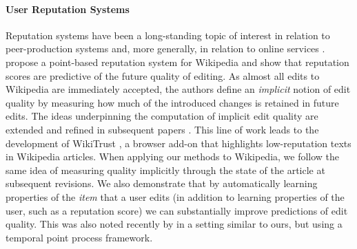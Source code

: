 \documentclass[format=sigconf]{acmart}
\begin{document}
\paragraph{User Reputation Systems}
Reputation systems have been a long-standing topic of interest in relation to peer-production systems and, more generally, in relation to online services \citep{resnick2000reputation}.
\citet{adler2007content} propose a point-based reputation system for Wikipedia and show that reputation scores are predictive of the future quality of editing.
As almost all edits to Wikipedia are immediately accepted, the authors define an \emph{implicit} notion of edit quality by measuring how much of the introduced changes is retained in future edits.
The ideas underpinning the computation of implicit edit quality are extended and refined in subsequent papers \citep{adler2008measuring, dealfaro2013content}.
This line of work leads to the development of WikiTrust \citep{dealfaro2011reputation}, a browser add-on that highlights low-reputation texts in Wikipedia articles.
When applying our methods to Wikipedia, we follow the same idea of measuring quality implicitly through the state of the article at subsequent revisions.
We also demonstrate that by automatically learning properties of the \emph{item} that a user edits (in addition to learning properties of the user, such as a reputation score) we can substantially improve predictions of edit quality.
This was also noted recently by \citet{tabibian2017distilling} in a setting similar to ours, but using a temporal point process framework.
\end{document}
